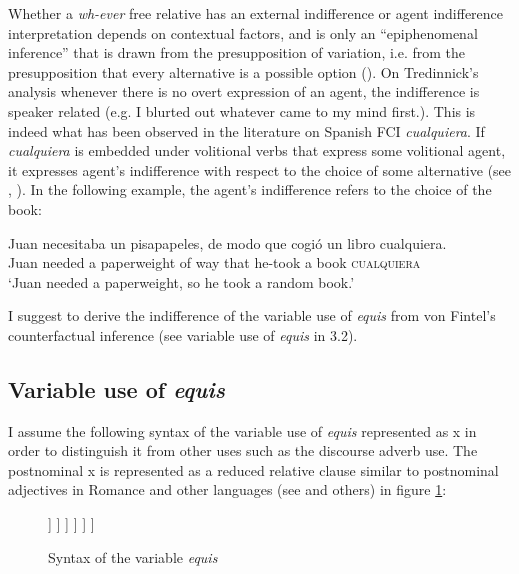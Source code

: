\documentclass[output=paper]{langsci/langscibook}
\begin{document}
Whether a \textit{wh-ever} free relative has an external indifference or agent indifference interpretation depends on contextual factors, and is only an “epiphenomenal inference” that is drawn from the presupposition of variation, i.e. from the presupposition that every alternative is a possible option (\citealt[108]{Tredinnick2005}). On Tredinnick’s analysis whenever there is no overt expression of an agent, the indifference is speaker related (e.g. I blurted out whatever came to my mind first.). This is indeed what has been observed in the literature on Spanish FCI \textit{cualquiera}. If \textit{cualquiera} is embedded under volitional verbs that express some volitional agent, it expresses agent's indifference with respect to the choice of some alternative (see \citealt{CR2008}, \citealt{AM2011}). In the following example, the agent’s indifference refers to the choice of the book:

\ea\label{ex:kellert:38}
\gll Juan necesitaba un pisapapeles, de modo que cogió un libro cualquiera.\\
Juan needed a paperweight of way that he-took a book \textsc{cualquiera}\\
\glt ‘Juan needed a paperweight, so he took a random book.’
\z

I suggest to derive the indifference of the variable use of \textit{equis} from von Fintel's counterfactual inference (see variable use of \textit{equis} in 3.2).

\subsection{Variable use of \textit{equis}}\label{sec:kellert:3.2}
I assume the following syntax of the variable use of \textit{equis} represented as x in order to distinguish it from other uses such as the discourse adverb use. The postnominal x is represented as a reduced relative clause similar to postnominal adjectives in Romance and other languages (see \citealt{Cinque:2010} and others) in figure \ref{fig:kellert:tree1n}:


\begin{figure}
	\begin{forest}
		[DP
			[D\\\textit{un}\\`a'] [NP
				[NP\\\textit{nombre}\\`name'] [CP
					[C\\(\textit{que})\\`that'] [TP
						[T\\(\textit{es})\\`is'] [VP
							[~] [NP [$X$,roof]]
						]
					]
				]
			]
		]
	\end{forest}
	\caption{Syntax of the variable \textit{equis}\label{fig:kellert:tree1n}}

\end{figure}
\end{document}
